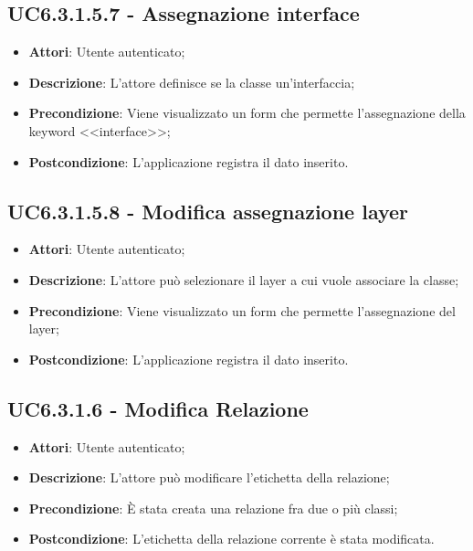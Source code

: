 \subsection{UC6.3.1.5.7 - Assegnazione interface} 
\label{ssec:UC6.3.1.5.7} 
\begin{itemize} 
\item \textbf{Attori}: Utente autenticato;
\item \textbf{Descrizione}: L'attore definisce se la classe un'interfaccia;
\item \textbf{Precondizione}: Viene visualizzato un form che permette l'assegnazione della keyword <<interface>>;
\item \textbf{Postcondizione}: L'applicazione registra il dato inserito.
\end{itemize} 
\subsection{UC6.3.1.5.8 - Modifica assegnazione layer} 
\label{ssec:UC6.3.1.5.8} 
\begin{itemize} 
\item \textbf{Attori}: Utente autenticato;
\item \textbf{Descrizione}: L'attore può selezionare il layer a cui vuole associare la classe;
\item \textbf{Precondizione}: Viene visualizzato un form che permette l'assegnazione del layer;
\item \textbf{Postcondizione}: L'applicazione registra il dato inserito.
\end{itemize} 
\subsection{UC6.3.1.6 - Modifica Relazione} 
\label{ssec:UC6.3.1.6} 
\begin{itemize} 
\item \textbf{Attori}: Utente autenticato;
\item \textbf{Descrizione}: L'attore può modificare l'etichetta della relazione;
\item \textbf{Precondizione}: È stata creata una relazione fra due o più classi;
\item \textbf{Postcondizione}: L'etichetta della relazione corrente è stata modificata.
\end{itemize} 
